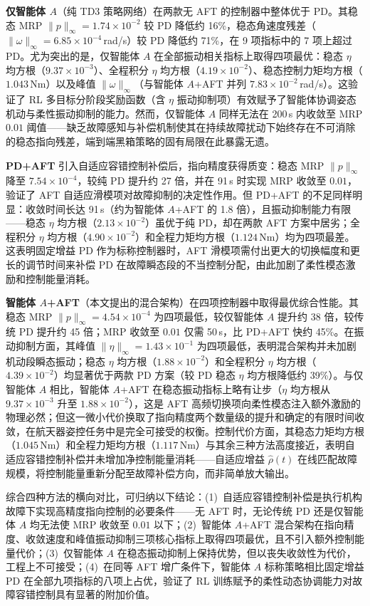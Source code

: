 \textbf{仅智能体 $A$}（纯 TD3 策略网络）在两款无 AFT 的控制器中整体优于 PD。其稳态 MRP $\|p\|_\infty = 1.74\times10^{-2}$ 较 PD 降低约 16\%，稳态角速度残差（$\|\omega\|_\infty = 6.85\times10^{-4}$\,rad/s）较 PD 降低约 71\%，在 9 项指标中的 7 项上超过 PD。尤为突出的是，仅智能体 $A$ 在全部振动相关指标上取得四项最优：稳态 $\eta$ 均方根（$9.37\times10^{-3}$）、全程积分 $\eta$ 均方根（$4.19\times10^{-2}$）、稳态控制力矩均方根（$1.043$\,Nm）以及峰值 $\|\omega\|_\infty$（与智能体 $A$+AFT 并列 $7.83\times10^{-2}$\,rad/s）。这验证了 RL 多目标分阶段奖励函数（含 $\eta$ 振动抑制项）有效赋予了智能体协调姿态机动与柔性振动抑制的能力。然而，仅智能体 $A$ 同样无法在 200\,s 内收敛至 MRP $0.01$ 阈值——缺乏故障感知与补偿机制使其在持续故障扰动下始终存在不可消除的稳态指向残差，端到端黑箱策略的固有局限在此暴露无遗。

\textbf{PD+AFT} 引入自适应容错控制补偿后，指向精度获得质变：稳态 MRP $\|p\|_\infty$ 降至 $7.54\times10^{-4}$，较纯 PD 提升约 27 倍，并在 91\,s 时实现 MRP 收敛至 $0.01$，验证了 AFT 自适应滑模项对故障抑制的决定性作用。但 PD+AFT 的不足同样明显：收敛时间长达 91\,s（约为智能体 $A$+AFT 的 1.8 倍），且振动抑制能力有限——稳态 $\eta$ 均方根（$2.13\times10^{-2}$）虽优于纯 PD，却在两款 AFT 方案中居劣；全程积分 $\eta$ 均方根（$4.90\times10^{-2}$）和全程力矩均方根（$1.124$\,Nm）均为四项最差。这表明固定增益 PD 作为标称控制器时，AFT 滑模项需付出更大的切换幅度和更长的调节时间来补偿 PD 在故障瞬态段的不当控制分配，由此加剧了柔性模态激励和控制能量消耗。

\textbf{智能体 $A$+AFT}（本文提出的混合架构）在四项控制器中取得最优综合性能。其稳态 MRP $\|p\|_\infty = 4.54\times10^{-4}$ 为四项最低，较仅智能体 $A$ 提升约 38 倍，较传统 PD 提升约 45 倍；MRP 收敛至 $0.01$ 仅需 50\,s，比 PD+AFT 快约 45\%。在振动抑制方面，其峰值 $\|\eta\|_\infty = 1.43\times10^{-1}$ 为四项最低，表明混合架构并未加剧机动段瞬态振动；稳态 $\eta$ 均方根（$1.88\times10^{-2}$）和全程积分 $\eta$ 均方根（$4.39\times10^{-2}$）均显著优于两款 PD 方案（较 PD 稳态 $\eta$ 均方根降低约 39\%）。与仅智能体 $A$ 相比，智能体 $A$+AFT 在稳态振动指标上略有让步（$\eta$ 均方根从 $9.37\times10^{-3}$ 升至 $1.88\times10^{-2}$），这是 AFT 高频切换项向柔性模态注入额外激励的物理必然；但这一微小代价换取了指向精度两个数量级的提升和确定的有限时间收敛，在航天器姿控任务中是完全可接受的权衡。控制代价方面，其稳态力矩均方根（$1.045$\,Nm）和全程力矩均方根（$1.117$\,Nm）与其余三种方法高度接近，表明自适应容错控制补偿并未增加净控制能量消耗——自适应增益 $\hat{\rho}(t)$ 在线匹配故障规模，将控制能量重新分配至故障补偿方向，而非简单放大输出。

综合四种方法的横向对比，可归纳以下结论：(1)~自适应容错控制补偿是执行机构故障下实现高精度指向控制的必要条件——无 AFT 时，无论传统 PD 还是仅智能体 $A$ 均无法使 MRP 收敛至 $0.01$ 以下；(2)~智能体 $A$+AFT 混合架构在指向精度、收敛速度和峰值振动抑制三项核心指标上取得四项最优，且不引入额外控制能量代价；(3)~仅智能体 $A$ 在稳态振动抑制上保持优势，但以丧失收敛性为代价，工程上不可接受；(4)~在同等 AFT 增广条件下，智能体 $A$ 标称策略相比固定增益 PD 在全部九项指标的八项上占优，验证了 RL 训练赋予的柔性动态协调能力对故障容错控制具有显著的附加价值。

